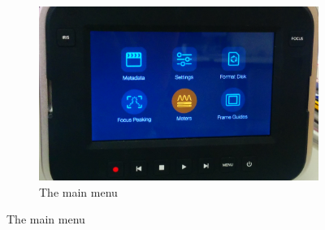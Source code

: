 \documentclass[[12pt,DIV14,BCOR12mm,a4paper,footexclude,headinclude,halfparskip-,twoside,openright,cleardoubleempty,idxtotoc,bibtotoc]{article}
\begin{document}
\begin{figure}[ht]
	\centering
	\begin{subfigure}[b]{0.30\textwidth}
	       \includegraphics[width=\textwidth]{figures/camera2.png}
	       \caption{The main menu}
		\label{fig_cam_a}
	\end{subfigure} 


\end{figure}
\end{document}
